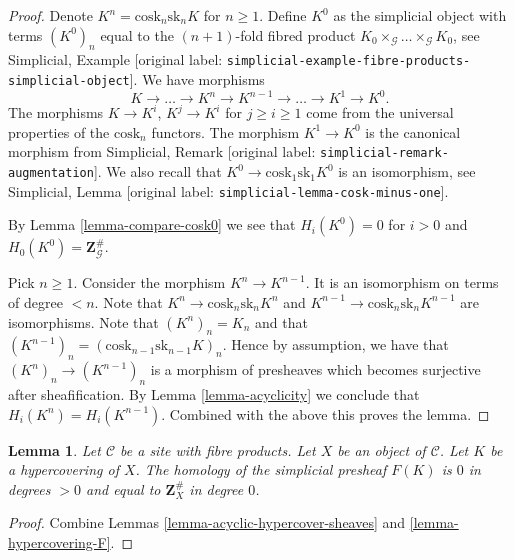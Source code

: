 \documentclass[10pt,a4paper]{article}
\theoremstyle{plain}
\newtheorem{lemma}[subsection]{Lemma}
\theoremstyle{definition}
\theoremstyle{remark}
\numberwithin{equation}{subsection}
\begin{document}
\begin{proof}
Denote $K^n = \text{cosk}_n \text{sk}_n K$ for $n \geq 1$.
Define $K^0$ as the simplicial object with terms
$(K^0)_n$ equal to the $(n + 1)$-fold fibred product
$K_0 \times_\mathcal{G} \ldots \times_\mathcal{G} K_0$,
see Simplicial,
Example \textnormal{[original label: \nolinkurl{simplicial-example-fibre-products-simplicial-object}]}.
We have morphisms
$$
K \longrightarrow \ldots \to K^n \to K^{n - 1} \to \ldots \to K^1 \to K^0.
$$
The morphisms $K \to K^i$, $K^j \to K^i$ for $j \geq i \geq 1$ come
from the universal properties of the $\text{cosk}_n$ functors.
The morphism $K^1 \to K^0$ is the canonical morphism
from
Simplicial, Remark \textnormal{[original label: \nolinkurl{simplicial-remark-augmentation}]}.
We also recall that $K^0 \to \text{cosk}_1 \text{sk}_1 K^0$
is an isomorphism, see
Simplicial, Lemma \textnormal{[original label: \nolinkurl{simplicial-lemma-cosk-minus-one}]}.

\medskip\noindent
By Lemma \ref{lemma-compare-cosk0} we see that
$H_i(K^0) = 0$ for $i > 0$ and $H_0(K^0) = \mathbf{Z}_\mathcal{G}^\#$.

\medskip\noindent
Pick $n \geq 1$. Consider the morphism $K^n \to K^{n - 1}$.
It is an isomorphism on terms of degree $< n$.
Note that $K^n \to \text{cosk}_n \text{sk}_n K^n$ and
$K^{n - 1} \to \text{cosk}_n \text{sk}_n K^{n - 1}$
are isomorphisms. Note that $(K^n)_n = K_n$ and
that $(K^{n - 1})_n = (\text{cosk}_{n - 1} \text{sk}_{n - 1} K)_n$.
Hence by assumption, we have that $(K^n)_n \to (K^{n - 1})_n$
is a morphism of presheaves which becomes surjective after
sheafification. By Lemma \ref{lemma-acyclicity} we conclude that
$H_i(K^n) = H_i(K^{n - 1})$.
Combined with the above this proves the lemma.
\end{proof}

\begin{lemma}
\label{lemma-hypercovering-acyclic}
Let $\mathcal{C}$ be a site with fibre products.
Let $X$ be an object of $\mathcal{C}$.
Let $K$ be a hypercovering of $X$.
The homology of the simplicial presheaf $F(K)$ is
$0$ in degrees $> 0$ and equal to $\mathbf{Z}_X^\#$
in degree $0$.
\end{lemma}

\begin{proof}
Combine Lemmas \ref{lemma-acyclic-hypercover-sheaves}
and \ref{lemma-hypercovering-F}.
\end{proof}
\end{document}
